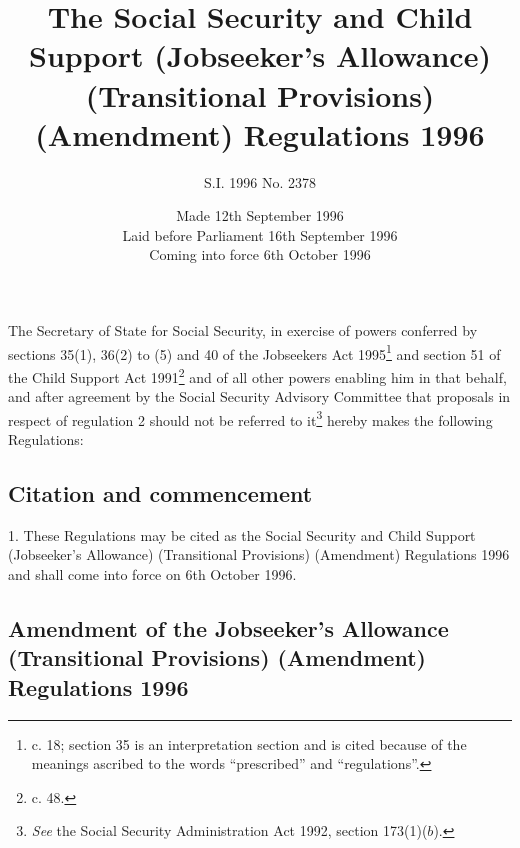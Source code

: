 \documentclass[a4paper]{article}
\title{The Social Security and Child Support (Jobseeker’s Allowance) (Transitional Provisions) (Amendment) Regulations 1996}
\author{S.I. 1996 No. 2378}
\date{Made 12th September 1996\\Laid before Parliament 16th September 1996\\Coming into force 6th October 1996}
\begin{document}
\maketitle

\noindent
The Secretary of State for Social Security, in exercise of powers conferred by sections 35(1), 36(2) to (5) and 40 of the Jobseekers Act 1995\footnote{ c. 18; section 35 is an interpretation section and is cited because of the meanings ascribed to the words “prescribed” and “regulations”.} and section 51 of the Child Support Act 1991\footnote{ c. 48.} and of all other powers enabling him in that behalf, and after agreement by the Social Security Advisory Committee that proposals in respect of regulation 2 should not be referred to it\footnote{\frenchspacing \emph{See} the Social Security Administration Act 1992, section 173(1)($b$).} hereby makes the following Regulations:

{\sloppy

\tableofcontents

}

\setcounter{secnumdepth}{-2}

\subsection[1. Citation and commencement]{Citation and commencement}

1.  These Regulations may be cited as the Social Security and Child Support (Jobseeker’s Allowance) (Transitional Provisions) (Amendment) Regulations 1996 and shall come into force on 6th October 1996.

\subsection[2. Amendment of the Jobseeker’s Allowance (Transitional Provisions) (Amendment) Regulations 1996]{Amendment of the Jobseeker’s Allowance (Transitional Provisions) (Amendment) Regulations 1996}
\end{document}
